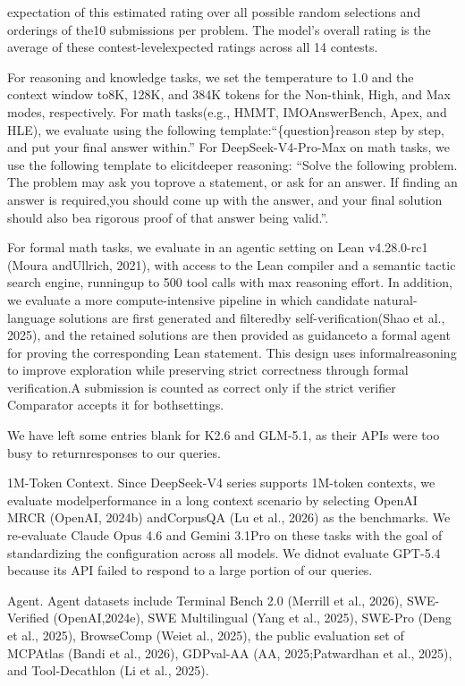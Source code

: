 \documentclass[
  10
]{article}
\begin{document}
expectation of this estimated rating over all possible random selections
and orderings of the10 submissions per problem. The model's overall
rating is the average of these contest-levelexpected ratings across all
14 contests.

For reasoning and knowledge tasks, we set the temperature to 1.0 and the
context window to8K, 128K, and 384K tokens for the Non-think, High, and
Max modes, respectively. For math tasks(e.g., HMMT, IMOAnswerBench,
Apex, and HLE), we evaluate using the following
template:``\{question\}\nPlease reason step by step, and put your final
answer within\boxed{}.'' For DeepSeek-V4-Pro-Max on math tasks, we use
the following template to elicitdeeper reasoning: ``Solve the following
problem. The problem may ask you toprove a statement, or ask for an
answer. If finding an answer is required,you should come up with the
answer, and your final solution should also bea rigorous proof of that
answer being valid.\n{}''.

For formal math tasks, we evaluate in an agentic setting on Lean
v4.28.0-rc1 (Moura andUllrich, 2021), with access to the Lean compiler
and a semantic tactic search engine, runningup to 500 tool calls with
max reasoning effort. In addition, we evaluate a more compute-intensive
pipeline in which candidate natural-language solutions are first
generated and filteredby self-verification(Shao et al., 2025), and the
retained solutions are then provided as guidanceto a formal agent for
proving the corresponding Lean statement. This design uses
informalreasoning to improve exploration while preserving strict
correctness through formal verification.A submission is counted as
correct only if the strict verifier Comparator accepts it for
bothsettings.

We have left some entries blank for K2.6 and GLM-5.1, as their APIs were
too busy to returnresponses to our queries.

1M-Token Context. Since DeepSeek-V4 series supports 1M-token contexts,
we evaluate modelperformance in a long context scenario by selecting
OpenAI MRCR (OpenAI, 2024b) andCorpusQA (Lu et al., 2026) as the
benchmarks. We re-evaluate Claude Opus 4.6 and Gemini 3.1Pro on these
tasks with the goal of standardizing the configuration across all
models. We didnot evaluate GPT-5.4 because its API failed to respond to
a large portion of our queries.

Agent. Agent datasets include Terminal Bench 2.0 (Merrill et al., 2026),
SWE-Verified (OpenAI,2024e), SWE Multilingual (Yang et al., 2025),
SWE-Pro (Deng et al., 2025), BrowseComp (Weiet al., 2025), the public
evaluation set of MCPAtlas (Bandi et al., 2026), GDPval-AA (AA,
2025;Patwardhan et al., 2025), and Tool-Decathlon (Li et al., 2025).
\end{document}
